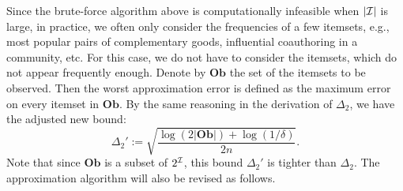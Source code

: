 \documentclass{article}
\begin{document}

Since the brute-force algorithm above is computationally infeasible when $|\mathcal{I}|$ is large, in practice, we often only consider the frequencies of a few itemsets, e.g., most popular pairs of complementary goods, influential coauthoring in a community, etc. For this case, we do not have to consider the itemsets, which do not appear frequently enough. 
\newcommand{\Ob}{\mathbf{Ob}}
Denote by $\Ob$ the set of the itemsets to be observed. Then the worst approximation error is defined as the maximum error on every itemset in $\Ob$. By the same reasoning in the derivation of $\Delta_2$, we have the adjusted new bound:
$$\Delta_2' := \sqrt{\frac{\log(2|\Ob|) + \log(1/\delta)}{2n}}.$$
Note that since $\Ob$ is a subset of $2^{\mathcal{I}}$, this bound $\Delta_2'$ is tighter than $\Delta_2$. The approximation algorithm will also be revised as follows.
\end{document}
